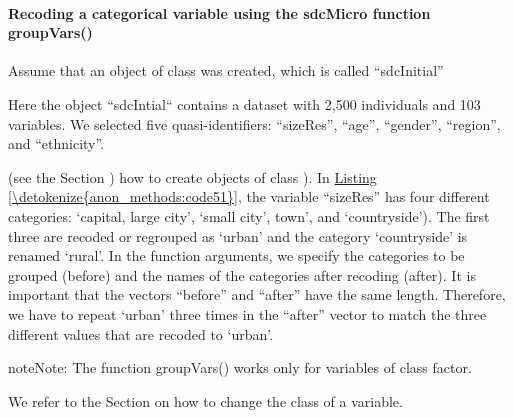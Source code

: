 \documentclass[letterpaper,10pt,english]{sphinxmanual}
\begin{document}
\paragraph{Recoding a categorical variable using the sdcMicro function groupVars()}
\label{\detokenize{anon_methods:recoding-a-categorical-variable-using-the-sdcmicro-function-groupvars}}
Assume that an object of class  was created, which is called
“sdcInitial” %
\begin{footnote}[2]\sphinxAtStartFootnote
Here the  object “sdcIntial“ contains a dataset with 2,500
individuals and 103 variables. We selected five quasi-identifiers:
“sizeRes”, “age”, “gender”, “region”, and “ethnicity”.
%
\end{footnote} (see the Section
)
how to create objects of class ). In \hyperref[\detokenize{anon_methods:code51}]{Listing \ref{\detokenize{anon_methods:code51}}}, the variable “sizeRes” has
four different categories: ‘capital, large city’, ‘small city’, town’,
and ‘countryside’). The first three are recoded or regrouped as ‘urban’
and the category ‘countryside’ is renamed ‘rural’. In the function
arguments, we specify the categories to be grouped (before) and the
names of the categories after recoding (after). It is important that the
vectors “before” and “after” have the same length. Therefore, we have to
repeat ‘urban’ three times in the “after” vector to match the three
different values that are recoded to ‘urban’.

\begin{sphinxadmonition}{note}{Note:}
The function groupVars() works only for variables of class factor.
\end{sphinxadmonition}

We refer to the Section 
on how to change the class of a variable.
\end{document}
